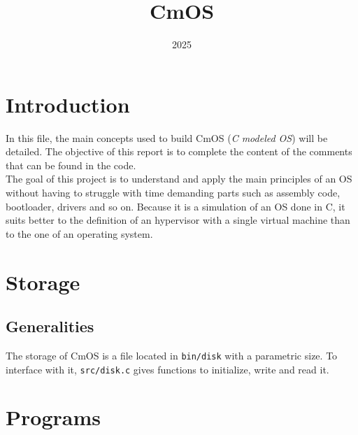 \documentclass[a4paper,12pt]{article}
\title{CmOS}
\date{2025}
\begin{document}
\maketitle


\section{Introduction}

In this file, the main concepts used to build CmOS (\textit{C modeled OS}) will be detailed. The objective of this report is to complete the content of the comments that can be found in the code.\\
The goal of this project is to understand and apply the main principles of an OS without having to struggle with time demanding parts such as assembly code, bootloader, drivers and so on. Because it is a simulation of an OS done in C, it suits better to the definition of an hypervisor with a single virtual machine than to the one of an operating system.

\section{Storage}

\subsection{Generalities}

The storage of CmOS is a file located in \texttt{bin/disk} with a parametric size. To interface with it, \texttt{src/disk.c} gives functions to initialize, write and read it.

\section{Programs}
\end{document}
